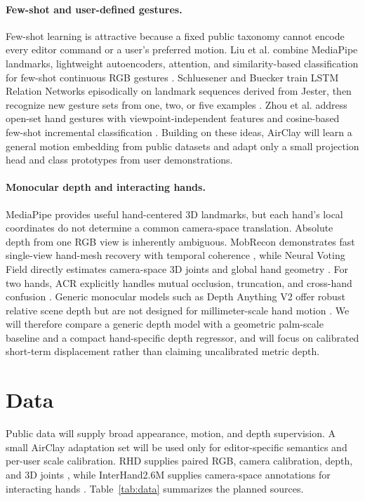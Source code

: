 \documentclass{article}
\begin{document}
\paragraph{Few-shot and user-defined gestures.}
Few-shot learning is attractive because a fixed public taxonomy cannot encode
every editor command or a user's preferred motion. Liu et al. combine
MediaPipe landmarks, lightweight autoencoders, attention, and similarity-based
classification for few-shot continuous RGB gestures
\citep{liu2022continuous}. Schluesener and Buecker train LSTM Relation Networks
episodically on landmark sequences derived from Jester, then recognize new
gesture sets from one, two, or five examples \citep{schluesener2022fast}.
Zhou et al. address open-set hand gestures with viewpoint-independent features
and cosine-based few-shot incremental classification
\citep{zhou2025openset}. Building on these ideas, AirClay will learn a general
motion embedding from public datasets and adapt only a small projection head
and class prototypes from user demonstrations.

\paragraph{Monocular depth and interacting hands.}
MediaPipe provides useful hand-centered 3D landmarks, but each hand's local
coordinates do not determine a common camera-space translation. Absolute depth
from one RGB view is inherently ambiguous. MobRecon demonstrates fast
single-view hand-mesh recovery with temporal coherence
\citep{chen2022mobrecon}, while Neural Voting Field directly estimates
camera-space 3D joints and global hand geometry \citep{huang2023nvf}. For two
hands, ACR explicitly handles mutual occlusion, truncation, and cross-hand
confusion \citep{yu2023acr}. Generic monocular models such as Depth Anything V2
offer robust relative scene depth but are not designed for millimeter-scale
hand motion \citep{yang2024depthanything}. We will therefore compare a generic
depth model with a geometric palm-scale baseline and a compact hand-specific
depth regressor, and will focus on calibrated short-term displacement rather
than claiming uncalibrated metric depth.

\section{Data}

Public data will supply broad appearance, motion, and depth supervision. A
small AirClay adaptation set will be used only for editor-specific semantics
and per-user scale calibration. RHD supplies paired RGB, camera calibration,
depth, and 3D joints \citep{zimmermann2017hand}, while InterHand2.6M supplies
camera-space annotations for interacting hands \citep{moon2020interhand}.
Table~\ref{tab:data} summarizes the planned sources.
\end{document}
